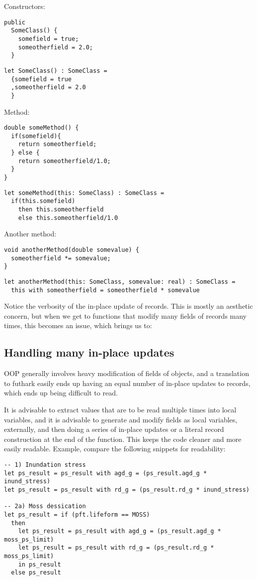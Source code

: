 Constructors:
\begin{verbatim}
public
  SomeClass() {
    somefield = true;
    someotherfield = 2.0;
  }
\end{verbatim}

\begin{verbatim}
let SomeClass() : SomeClass =
  {somefield = true
  ,someotherfield = 2.0
  }
\end{verbatim}

Method:
\begin{verbatim}
double someMethod() {
  if(somefield){
    return someotherfield;
  } else {
    return someotherfield/1.0;
  }
}
\end{verbatim}
\begin{verbatim}
let someMethod(this: SomeClass) : SomeClass =
  if(this.somefield)
    then this.someotherfield
    else this.someotherfield/1.0
\end{verbatim}

Another method:
\begin{verbatim}
void anotherMethod(double somevalue) {
  someotherfield *= somevalue;
}
\end{verbatim}
\begin{verbatim}
let anotherMethod(this: SomeClass, somevalue: real) : SomeClass =
  this with someotherfield = someotherfield * somevalue
\end{verbatim}

Notice the verbosity of the in-place update of records. This is mostly an aesthetic concern, but when we get to functions that modify many fields of records many times, this becomes an issue, which brings us to:

\subsection{Handling many in-place updates}

OOP generally involves heavy modification of fields of objects, and a translation to futhark easily ends up having an equal number of in-place updates to records, which ends up being difficult to read.

It is advisable to extract values that are to be read multiple times into local variables, and it is advisable to generate and modify fields as local variables, externally, and then doing a series of in-place updates or a literal record construction at the end of the function. This keeps the code cleaner and more easily readable. Example, compare the following snippets for readability:
\newpage
\begin{verbatim}
-- 1) Inundation stress
let ps_result = ps_result with agd_g = (ps_result.agd_g * inund_stress)
let ps_result = ps_result with rd_g = (ps_result.rd_g * inund_stress)

-- 2a) Moss dessication
let ps_result = if (pft.lifeform == MOSS)
  then
    let ps_result = ps_result with agd_g = (ps_result.agd_g * moss_ps_limit)
    let ps_result = ps_result with rd_g = (ps_result.rd_g * moss_ps_limit)
    in ps_result
  else ps_result
\end{verbatim}

